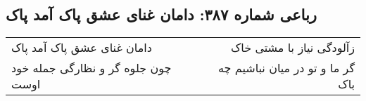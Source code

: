 \begin{center}
\section*{رباعی شماره ۳۸۷: دامان غنای عشق پاک آمد پاک}
\label{sec:sh387}
\begin{longtable}{l p{0.5cm} r}
دامان غنای عشق پاک آمد پاک
&&
زآلودگی نیاز با مشتی خاک
\\
چون جلوه گر و نظارگی جمله خود اوست
&&
گر ما و تو در میان نباشیم چه باک
\\
\end{longtable}
\end{center}
